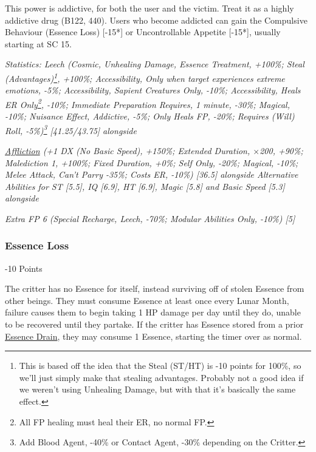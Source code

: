 \begin{multicols*}{3}
	This power is addictive, for both the user and the victim. Treat it as a highly addictive drug (B122, 440). Users who become addicted can gain the Compulsive Behaviour (Essence Loss) [-15*] or Uncontrollable Appetite [-15*], usually starting at SC 15.
	
	\textcolor{OliveGreen}{\textit{Statistics: Leech (Cosmic, Unhealing Damage, Essence Treatment, +100\%; Steal (Advantages)\footnote{This is based off the idea that the Steal (ST/HT) is -10 points for 100\%, so we'll just simply make that stealing advantages. Probably not a good idea if we weren't using Unhealing Damage, but with that it's basically the same effect.}, +100\%; Accessibility, Only when target experiences extreme emotions, -5\%; Accessibility, Sapient Creatures Only, -10\%; Accessibility, Heals ER Only\footnote{All FP healing must heal their ER, no normal FP.}, -10\%; Immediate Preparation Requires, 1 minute, -30\%; Magical, -10\%; Nuisance Effect, Addictive, -5\%; Only Heals FP, -20\%; Requires (Will) Roll, -5\%)\footnote{Add Blood Agent, -40\% or Contact Agent, -30\% depending on the Critter.} [41.25/43.75] alongside}}
			
	 \textcolor{OliveGreen}{\textit{\textcolor{Blue}{\href{http://forums.sjgames.com/showthread.php?t=152300}{Affliction}} (+1 DX (No Basic Speed), +150\%; Extended Duration, $\times$200, +90\%; Malediction 1, +100\%; Fixed Duration, +0\%; Self Only, -20\%; Magical, -10\%; Melee Attack, Can't Parry -35\%; Costs ER, -10\%) [36.5] alongside Alternative Abilities for ST [5.5], IQ [6.9], HT [6.9], Magic [5.8] and Basic Speed [5.3] alongside}}
	 
	 \textcolor{OliveGreen}{\textit{ Extra FP 6 (Special Recharge, Leech, -70\%; Modular Abilities Only, -10\%) [5] }}
	 
	 
	 \subsubsection{Essence Loss}\label{essence_loss}
	 \begin{flushright}
	 	-10 Points
	 \end{flushright}
 
 	The critter has no Essence for itself, instead surviving off of stolen Essence from other beings. They must consume Essence at least once every Lunar Month, failure causes them to begin taking 1 HP damage per day until they do, unable to be recovered until they partake. If the critter has Essence stored from a prior \hyperref[essence_drain]{Essence Drain}, they may consume 1 Essence, starting the timer over as normal.
 	

\end{multicols*}
